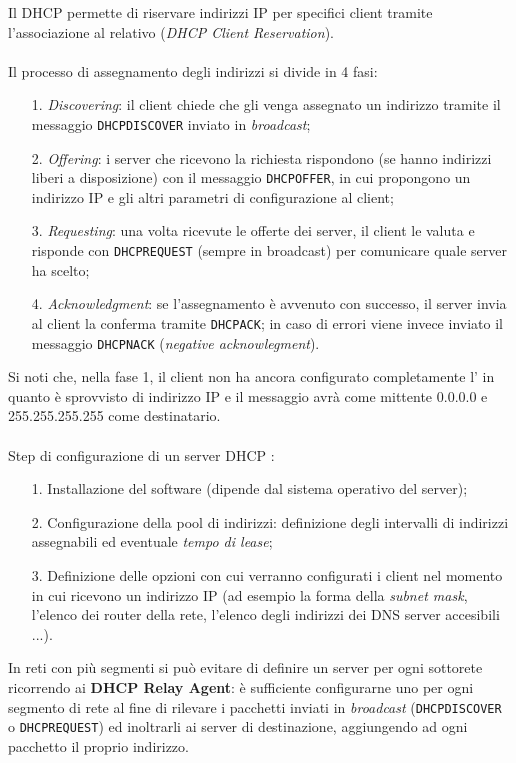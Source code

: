\documentclass[a4paper,11pt]{article}
\def\code#1{\texttt{#1}}
\def\vedi#1{\nameref{#1}}
\def\italic#1{\textit{#1}}
\begin{document}
Il DHCP permette di riservare indirizzi IP per specifici client tramite l'associazione al relativo \vedi{Indirizzo MAC} (\italic{DHCP Client Reservation}).
\\\\Il processo di assegnamento degli indirizzi si divide in 4 fasi:
\begin{itemize}
	\item[1.] \italic{Discovering}: il client chiede che gli venga assegnato un indirizzo tramite il messaggio \code{DHCPDISCOVER} inviato in \textit{broadcast};
	\item[2.] \italic{Offering}: i server che ricevono la richiesta rispondono (se hanno indirizzi liberi a disposizione) con il messaggio \code{DHCPOFFER}, in cui propongono un indirizzo IP e gli altri parametri di configurazione al client;
	\item[3.] \italic{Requesting}: una volta ricevute le offerte dei server, il client le valuta e risponde con \code{DHCPREQUEST} (sempre in broadcast) per comunicare quale server ha scelto;
	\item[4.] \italic{Acknowledgment}: se l'assegnamento è avvenuto con successo, il server invia al client la conferma tramite \code{DHCPACK}; in caso di errori viene invece inviato il messaggio \code{DHCPNACK} (\italic{negative acknowlegment}).
\end{itemize}
Si noti che, nella fase 1, il client non ha ancora configurato completamente l'\vedi{Internet protocol suite (TCP/IP)} in quanto è sprovvisto di indirizzo IP e il messaggio avrà come mittente 0.0.0.0 e 255.255.255.255 come destinatario.
\\\\Step di configurazione di un server DHCP :
\begin{itemize}
	\item[1.] Installazione del software (dipende dal sistema operativo del server);
	\item[2.] Configurazione della pool di indirizzi: definizione degli intervalli di indirizzi assegnabili ed eventuale \italic{tempo di lease};
	\item[3.] Definizione delle opzioni con cui verranno configurati i client nel momento in cui ricevono un indirizzo IP (ad esempio la forma della \italic{subnet mask}, l'elenco dei router della rete, l'elenco degli indirizzi dei DNS server accesibili ...).
\end{itemize}
In reti con più segmenti si può evitare di definire un server per ogni sottorete ricorrendo ai \textbf{DHCP Relay Agent}: è sufficiente configurarne uno per ogni segmento di rete al fine di rilevare i pacchetti inviati in \italic{broadcast} (\code{DHCPDISCOVER} o \code{DHCPREQUEST}) ed inoltrarli ai server di destinazione, aggiungendo ad ogni pacchetto il proprio indirizzo.\\
\end{document}
